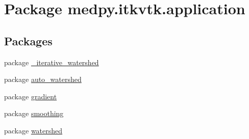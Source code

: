 \hypertarget{namespacemedpy_1_1itkvtk_1_1application}{
\section{Package medpy.itkvtk.application}
\label{namespacemedpy_1_1itkvtk_1_1application}
}
\subsection*{Packages}
\begin{DoxyCompactItemize}
\item 
package \hyperlink{namespacemedpy_1_1itkvtk_1_1application_1_1__iterative__watershed}{\_\-iterative\_\-watershed}
\item 
package \hyperlink{namespacemedpy_1_1itkvtk_1_1application_1_1auto__watershed}{auto\_\-watershed}
\item 
package \hyperlink{namespacemedpy_1_1itkvtk_1_1application_1_1gradient}{gradient}
\item 
package \hyperlink{namespacemedpy_1_1itkvtk_1_1application_1_1smoothing}{smoothing}
\item 
package \hyperlink{namespacemedpy_1_1itkvtk_1_1application_1_1watershed}{watershed}
\end{DoxyCompactItemize}

